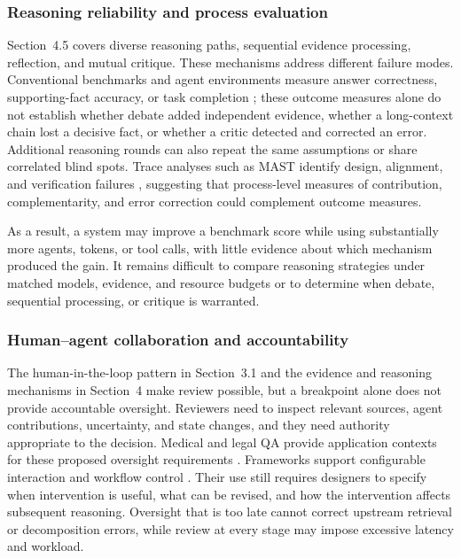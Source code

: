\documentclass[a4paper,fleqn]{cas-dc}
\begin{document}
\subsubsection{Reasoning reliability and process evaluation}
\label{sec:evaluation_challenges}

Section~4.5 covers diverse reasoning paths, sequential evidence processing,
reflection, and mutual critique. These mechanisms address different failure
modes. Conventional benchmarks and agent environments measure answer
correctness, supporting-fact accuracy, or task completion
\citep{hendrycks2021mmlu,yang2018hotpotqa,liu2024agentbench,mialon2024gaia};
these outcome measures alone do not establish whether debate added independent
evidence, whether a long-context chain lost a decisive fact, or whether a
critic detected and corrected an error. Additional reasoning rounds
can also repeat the same assumptions or share correlated blind spots. Trace
analyses such as MAST identify design, alignment, and verification failures
\citep{han2024mast}, suggesting that process-level measures of contribution,
complementarity, and error correction could complement outcome measures.

As a result, a system may improve a benchmark score while using substantially
more agents, tokens, or tool calls, with little evidence about which mechanism
produced the gain. It remains difficult to compare reasoning strategies under
matched models, evidence, and resource budgets or to determine when debate,
sequential processing, or critique is warranted.

\subsubsection{Human--agent collaboration and accountability}
\label{sec:oversight_challenges}

The human-in-the-loop pattern in Section~3.1 and the evidence and reasoning
mechanisms in Section~4 make review possible, but a breakpoint alone does not
provide accountable oversight. Reviewers need to inspect relevant sources,
agent contributions, uncertainty, and state changes, and they need authority
appropriate to the decision. Medical and legal QA provide application
contexts for these proposed oversight requirements
\citep{tang2024medagents,cui2023chatlaw}. Frameworks support configurable
interaction and workflow control \citep{duan2024langgraph_crewai,
langgraph2024interrupt}. Their use still requires designers to specify when
intervention is useful, what can be revised, and how the intervention affects
subsequent reasoning. Oversight that
is too late cannot correct upstream retrieval or decomposition errors, while
review at every stage may impose excessive latency and workload.
\end{document}
